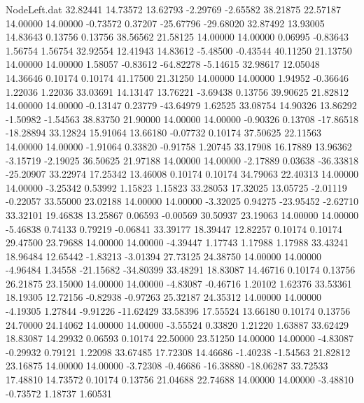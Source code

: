 \begin{filecontents}{NodeLeft.dat}
  32.82441   14.73572   13.62793    -2.29769   -2.65582   38.21875   22.57187   14.00000   14.00000   -0.73572    0.37207  -25.67796  -29.68020
  32.87492   13.93005   14.83643     0.13756    0.13756   38.56562   21.58125   14.00000   14.00000    0.06995   -0.83643    1.56754    1.56754
  32.92554   12.41943   14.83612    -5.48500   -0.43544   40.11250   21.13750   14.00000   14.00000    1.58057   -0.83612  -64.82278   -5.14615
  32.98617   12.05048   14.36646     0.10174    0.10174   41.17500   21.31250   14.00000   14.00000    1.94952   -0.36646    1.22036    1.22036
  33.03691   14.13147   13.76221    -3.69438    0.13756   39.90625   21.82812   14.00000   14.00000   -0.13147    0.23779  -43.64979    1.62525
  33.08754   14.90326   13.86292    -1.50982   -1.54563   38.83750   21.90000   14.00000   14.00000   -0.90326    0.13708  -17.86518  -18.28894
  33.12824   15.91064   13.66180    -0.07732    0.10174   37.50625   22.11563   14.00000   14.00000   -1.91064    0.33820   -0.91758    1.20745
  33.17908   16.17889   13.96362    -3.15719   -2.19025   36.50625   21.97188   14.00000   14.00000   -2.17889    0.03638  -36.33818  -25.20907
  33.22974   17.25342   13.46008     0.10174    0.10174   34.79063   22.40313   14.00000   14.00000   -3.25342    0.53992    1.15823    1.15823
  33.28053   17.32025   13.05725    -2.01119   -0.22057   33.55000   23.02188   14.00000   14.00000   -3.32025    0.94275  -23.95452   -2.62710
  33.32101   19.46838   13.25867     0.06593   -0.00569   30.50937   23.19063   14.00000   14.00000   -5.46838    0.74133    0.79219   -0.06841
  33.39177   18.39447   12.82257     0.10174    0.10174   29.47500   23.79688   14.00000   14.00000   -4.39447    1.17743    1.17988    1.17988
  33.43241   18.96484   12.65442    -1.83213   -3.01394   27.73125   24.38750   14.00000   14.00000   -4.96484    1.34558  -21.15682  -34.80399
  33.48291   18.83087   14.46716     0.10174    0.13756   26.21875   23.15000   14.00000   14.00000   -4.83087   -0.46716    1.20102    1.62376
  33.53361   18.19305   12.72156    -0.82938   -0.97263   25.32187   24.35312   14.00000   14.00000   -4.19305    1.27844   -9.91226  -11.62429
  33.58396   17.55524   13.66180     0.10174    0.13756   24.70000   24.14062   14.00000   14.00000   -3.55524    0.33820    1.21220    1.63887
  33.62429   18.83087   14.29932     0.06593    0.10174   22.50000   23.51250   14.00000   14.00000   -4.83087   -0.29932    0.79121    1.22098
  33.67485   17.72308   14.46686    -1.40238   -1.54563   21.82812   23.16875   14.00000   14.00000   -3.72308   -0.46686  -16.38880  -18.06287
  33.72533   17.48810   14.73572     0.10174    0.13756   21.04688   22.74688   14.00000   14.00000   -3.48810   -0.73572    1.18737    1.60531

\end{filecontents}
